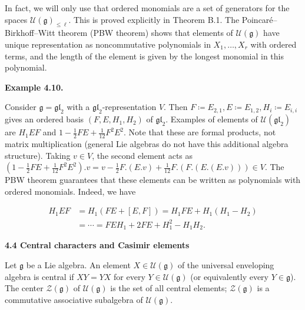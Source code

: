 In fact, we will only use that ordered monomials are a set of generators for the spaces $\mathcal{U}(\mathfrak{g})_{\leq\ell}$. This is proved explicitly in Theorem B.1.
The Poincaré–Birkhoff–Witt theorem (PBW theorem) shows that elements of $\mathcal{U}(\mathfrak{g})$ have unique representation as noncommutative polynomials in $X_{1},\dots,X_{r}$ with ordered terms, and the length of the element is given by the longest monomial in this polynomial.





\par\medskip\noindent\textbf{Example 4.10.}\par



Consider $\mathfrak{g}=\mathfrak{gl}_{2}$ with a $\mathfrak{gl}_{2}$-representation $V$.
Then $F\coloneqq E_{2,1},E\coloneqq E_{1,2},H_{i}\coloneqq E_{i,i}$ gives an ordered basis $(F,E,H_{1},H_{2})$ of $\mathfrak{gl}_{2}$.
Examples of elements of $\mathcal{U}(\mathfrak{gl}_{2})$ are $H_{1}EF$ and $1-\tfrac{1}{2}FE+\tfrac{1}{12}F^{2}E^{2}$.
Note that these are formal products, not matrix multiplication (general Lie algebras do not have this additional algebra structure).
Taking $v\in V$, the second element acts as
$(1-\tfrac{1}{2}FE+\tfrac{1}{12}F^{2}E^{2}).v=v-\tfrac{1}{2}F.(E.v)+\tfrac{1}{12}F.(F.(E.(E.v)))\in V$.
The PBW theorem guarantees that these elements can be written as polynomials with ordered monomials. Indeed, we have



\[\begin{aligned}
\displaystyle H_{1}EF & \displaystyle=H_{1}(FE+[E,F])=H_{1}FE+H_{1}(H_{1}-H_{2}) \\
 & \displaystyle=\cdots=FEH_{1}+2FE+H_{1}^{2}-H_{1}H_{2}.\ 
\end{aligned}\]






\par\medskip\noindent\textbf{4.4 Central characters and Casimir elements}\par




Let $\mathfrak{g}$ be a Lie algebra. An element $X\in\mathcal{U}(\mathfrak{g})$ of the universal enveloping algebra is central if $XY=YX$ for every $Y\in\mathcal{U}(\mathfrak{g})$ (or equivalently every $Y\in\mathfrak{g}$). The center $\mathcal{Z}(\mathfrak{g})$ of $\mathcal{U}(\mathfrak{g})$ is the set of all central elements; $\mathcal{Z}(\mathfrak{g})$ is a commutative associative subalgebra of $\mathcal{U}(\mathfrak{g})$.





